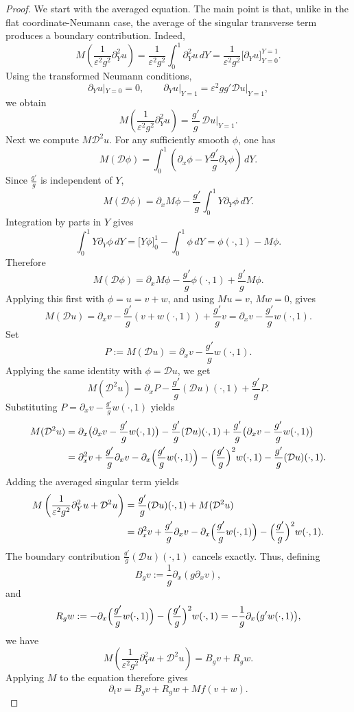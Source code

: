 \documentclass[10pt,a4paper]{amsart}
\begin{document}
\begin{proof}
We start with the averaged equation. 
The main point is that, unlike in the flat coordinate-Neumann case, the average of the singular transverse term produces a boundary contribution. Indeed,
\[
M\left(\frac1{\varepsilon^2g^2}\partial_Y^2u\right)
=
\frac1{\varepsilon^2g^2}
\int_0^1\partial_Y^2u\,dY
=
\frac1{\varepsilon^2g^2}
\bigl[\partial_Yu\bigr]_{Y=0}^{Y=1}.
\]
Using the transformed Neumann conditions,
\[
\partial_Yu|_{Y=0}=0,
\qquad
\partial_Yu|_{Y=1}
=
\varepsilon^2gg'\mathcal Du|_{Y=1},
\]
we obtain
\[
M\left(\frac1{\varepsilon^2g^2}\partial_Y^2u\right)
=
\frac{g'}g\,\mathcal Du|_{Y=1}.
\]
Next we compute \(M\mathcal D^2u\). For any sufficiently smooth \(\phi\), one has
\[
M(\mathcal D\phi)
=
\int_0^1(\partial_x\phi-Y \frac{g'}g\partial_Y\phi)\,dY.
\]
Since \(\frac{g'}g\) is independent of \(Y\),
\[
M(\mathcal D\phi)
=
\partial_xM\phi
-
\frac{g'}g\int_0^1Y\partial_Y\phi\,dY.
\]
Integration by parts in \(Y\) gives
\[
\int_0^1Y\partial_Y\phi\,dY
=
\bigl[Y\phi\bigr]_{0}^{1}
-
\int_0^1\phi\,dY
=
\phi(\cdot,1)-M\phi.
\]
Therefore
\[
M(\mathcal D\phi)
=
\partial_x M\phi
-
\frac{g'}g\phi(\cdot,1)
+
\frac{g'}g M\phi.
\]
Applying this first with \(\phi=u=v+w\), and using \(Mu=v\), \(Mw=0\), gives
\[
M(\mathcal Du)
=
\partial_xv-\frac{g'}g(v+w(\cdot,1))+\frac{g'}g v
=
\partial_xv-\frac{g'}g w(\cdot,1).
\]
Set
\[
P:=M(\mathcal Du)=\partial_xv-\frac{g'}g w(\cdot,1).
\]
Applying the same identity with \(\phi=\mathcal Du\), we get
\[
M(\mathcal D^2u)
=
\partial_xP
-
\frac{g'}g(\mathcal Du)(\cdot,1)
+
\frac{g'}gP.
\]
Substituting \(P=\partial_xv-\frac{g'}gw(\cdot,1)\) yields
\[
\begin{aligned}
M(\mathcal D^2u)
&=
\partial_x\bigl(\partial_xv-\frac{g'}gw(\cdot,1)\bigr)
-
\frac{g'}g(\mathcal Du)(\cdot,1)
+
\frac{g'}g\bigl(\partial_xv-\frac{g'}g w(\cdot,1)\bigr)
\\
&=
\partial_x^2v
+
\frac{g'}g\partial_xv
-
\partial_x\Bigl(\frac{g'}gw(\cdot,1)\Bigr)
-
\Bigl(\frac{g'}g\Bigr)^2w(\cdot,1)
-
\frac{g'}g(\mathcal Du)(\cdot,1).
\end{aligned}
\]
Adding the averaged singular term yields
\[
\begin{aligned}
M\left(
\frac1{\varepsilon^2g^2}\partial_Y^2u+\mathcal D^2u
\right)
&=
\frac{g'}g(\mathcal Du)(\cdot,1)
+
M(\mathcal D^2u)
\\
&=
\partial_x^2v
+
\frac{g'}g\partial_xv
-
\partial_x\Bigl(\frac{g'}g w(\cdot,1)\Bigr)
-
\Bigl( \frac{g'}g\Bigr)^2w(\cdot,1).
\end{aligned}
\]
The boundary contribution \(\frac{g'}g(\mathcal Du)(\cdot,1)\) cancels exactly. Thus, defining
\[
 B_gv:=\frac1g\partial_x(g\partial_xv),
\]
and
\[
R_gw
:=
-\partial_x\Bigl( \frac{g'}g w(\cdot,1)\Bigr)-\Bigl(\frac{g'}g\Bigr)^2w(\cdot,1)= -\frac1g\partial_x\bigl(g'w(\cdot,1)\bigr),
\]
we have
\[
M\left(
\frac1{\varepsilon^2g^2}\partial_Y^2u+\mathcal D^2u
\right)
=
B_gv+R_gw.
\]
Applying \(M\) to the equation therefore gives
\[
\partial_tv
=
 B_gv+R_gw+Mf(v+w).
\]


\end{proof}
\end{document}
